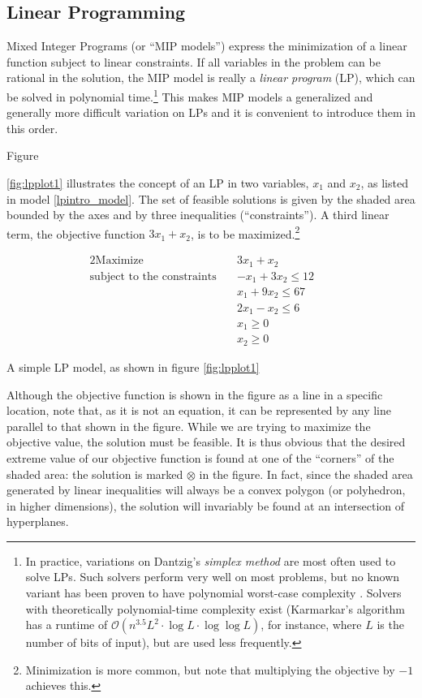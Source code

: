 \documentclass[13pt, letterpaper, oneside]{book}
\begin{document}
\subsection{Linear Programming}
Mixed Integer Programs (or ``MIP
models'') express the minimization of a linear function subject to linear
constraints. If all variables in the problem can be rational in the solution,
the MIP model is really a \textit{linear program} (LP), which can be solved in
polynomial time.\footnote{In practice, variations on Dantzig's \textit{simplex
method} are most often used to solve LPs. Such solvers perform very well on most
problems, but no known variant has been proven to have polynomial worst-case
complexity \citep{papadimitriou}. Solvers with theoretically polynomial-time
complexity exist (Karmarkar's algorithm \citet{karmarkar} has a runtime of
$\mathcal{O}(n^{3.5}L^2 \cdot \log L \cdot \log \log L)$, for instance, where
$L$ is the number of bits of input), but are used less frequently.} This makes
MIP models a generalized and generally more difficult variation on LPs and it is
convenient to introduce them in this order. 

Figure

\ref{fig:lpplot1} illustrates the concept of an LP in two variables, $x_1$ and
$x_2$, as listed in model \ref{lpintro_model}. The set of feasible solutions is given by the shaded area bounded by the axes
and by three inequalities (``constraints''). A third linear term, the objective
function $3x_1 + x_2$, is to be maximized.\footnote{Minimization is more common,
but note that multiplying the objective by $-1$ achieves this.} 
\begin{model}
\begin{alignat}{2}
\text{Maximize}\quad & 3x_1 + x_2 && \\
\text{subject to the constraints}\quad & -x_1 + 3x_2 \leq 12 &&\\
& x_1 + 9x_2 \leq 67 && \\
& 2x_1 - x_2 \leq 6 && \\
& x_1 \geq 0 && \\
& x_2 \geq 0 && 
\end{alignat}
\caption{A simple LP model, as shown in figure \ref{fig:lpplot1}}
\label{lpintro_model}
\end{model}

Although the objective function is shown in the figure as a line in a specific
location, note that, as it is not an equation, it can be represented by any line
parallel to that shown in the figure. While we are trying to maximize the
objective value, the solution must be feasible. It is thus obvious
that the desired extreme value of our objective function is found at one of the
``corners'' of the shaded area: the solution is marked $\otimes$ in the figure.
In fact, since the shaded area generated by linear inequalities will always be a
convex polygon (or polyhedron, in higher dimensions), the solution will
invariably be found at an intersection of hyperplanes.
\end{document}
